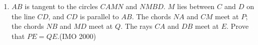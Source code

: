 \begin{enumerate}
\item $AB$ is tangent to the circles $CAMN$ and $NMBD$. $M$ lies between $C$ and $D$ on the line $CD$, and $CD$ is parallel to $AB$. The chords $NA$ and $CM$ meet at $P$; the chords $NB$ and $MD$ meet at $Q$. The rays $CA$ and $DB$ meet at $E$. Prove that $PE = QE$.\hfill(IMO 2000)
\end{enumerate}	
